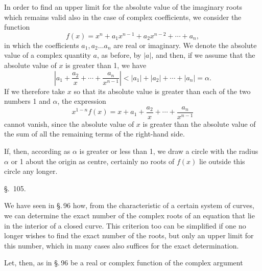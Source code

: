 
In order to find an upper limit for the absolute value of the imaginary
roots which remains valid also in the case of complex coefficients, we
consider the function
\[
f(x)=x^n+a_1x^{n-1}+a_2x^{n-2}+\cdots+a_n,
\]
in which the coefficients $a_1, a_2\ldots a_n$ are real or imaginary.
We denote the absolute value of a complex quantity $a$, as before, by
$|a|$, and then, if we assume that the absolute value of $x$ is greater
than 1, we have
\[
\left| a_1+\frac{a_2}{x}+\cdots+\frac{a_n}{x^{n-1}} \right| <
|a_1|+|a_2|+\cdots+|a_n|=\alpha.
\]
If we therefore take $x$ so that its absolute value is greater than
each of the two numbers 1 and $\alpha$, the expression
\[
x^{1-n}f(x)=x+a_1+\frac{a_2}{x}+\cdots+\frac{a_n}{x^{n-1}}
\]
cannot vanish, since the absolute value of $x$ is greater than the
absolute value of the sum of all the remaining terms of the right-hand
side.

If, then, according as $\alpha$ is greater or less than 1, we draw a
circle with the radius $\alpha$ or 1 about the origin as centre,
certainly no roots of $f(x)$ lie outside this circle any longer.

\begin{center}
\S.\ 105.

\end{center}

We have seen in \S.\,96 how, from the characteristic of a certain
system of curves, we can determine the exact number of the complex
roots of an equation that lie in the interior of a closed curve. This
criterion too can be simplified if one no longer wishes to find the
exact number of the roots, but only an upper limit for this number,
which in many cases also suffices for the exact determination.

Let, then, as in \S.\,96
be a real or complex function of the complex argument
